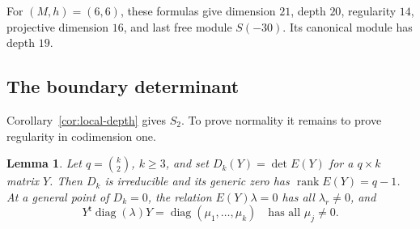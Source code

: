 \documentclass[11pt]{article}
\newtheorem{lemma}[theorem]{Lemma}
\theoremstyle{definition}
\theoremstyle{remark}
\numberwithin{equation}{section}
\DeclareMathOperator{\rank}{rank}
\DeclareMathOperator{\diag}{diag}
\begin{document}
For $(M,h)=(6,6)$, these formulas give dimension $21$, depth $20$,
regularity $14$, projective dimension $16$, and last free module
$S(-30)$. Its canonical module has depth $19$.

\subsection{The boundary determinant}

Corollary~\ref{cor:local-depth} gives $S_2$. To prove normality it
remains to prove regularity in codimension one.

\begin{lemma}\label{lem:det-irreducible}
Let $q=\binom k2$, $k\geq3$, and set $D_k(Y)=\det E(Y)$ for a
$q\times k$ matrix $Y$. Then $D_k$ is irreducible and its generic
zero has $\rank E(Y)=q-1$. At a general point of $D_k=0$, the
relation $E(Y)\lambda=0$ has all $\lambda_r\ne0$, and
\[
 Y^{\mathsf t}\diag(\lambda)Y=\diag(\mu_1,\ldots,\mu_k)
 \quad\text{has all }\mu_j\ne0.
\]
\end{lemma}
\end{document}
